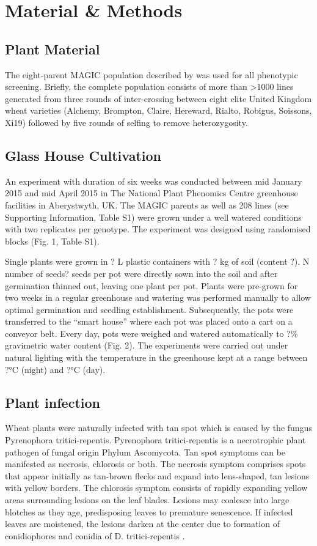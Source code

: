 \documentclass{frontiersSCNS} %
\begin{document}
\section{Material \& Methods}

\subsection{Plant Material}
The eight-parent MAGIC population described by \cite{Mackay01092014} was used for all phenotypic screening. Briefly, the complete population consists of more than >1000 lines generated from three rounds of inter-crossing between eight elite United Kingdom wheat varieties (Alchemy, Brompton, Claire, Hereward, Rialto, Robigus, Soissons, Xi19) followed by five rounds of selfing to remove heterozygosity. 

\subsection{Glass House Cultivation}
An experiment with duration of six weeks was conducted between mid January 2015 and mid April 2015 in The National Plant Phenomics Centre greenhouse facilities in Aberystwyth, UK. The MAGIC parents as well as 208 lines (see Supporting Information, Table S1) were grown under a well watered conditions with two replicates per genotype. The experiment was designed using randomised blocks (Fig. 1, Table S1).

Single plants were grown in ? L plastic containers with ? kg of soil (content ?). N number of seeds? seeds per pot were directly sown into the soil and after germination thinned out, leaving one plant per pot. Plants were pre-grown for two weeks in a regular greenhouse and watering was performed manually to allow optimal germination and seedling establishment. Subsequently, the pots were transferred to the “smart house” where each pot was placed onto a cart on a conveyor belt. Every day, pots were weighed and watered automatically to ?\% gravimetric water content (Fig. 2). The experiments were carried out under natural lighting with the temperature in the greenhouse kept at a range between ?°C (night) and ?°C (day).

\subsection{Plant infection}
Wheat plants were naturally infected with tan spot which is caused by the fungus Pyrenophora tritici-repentis. Pyrenophora tritici-repentis is a necrotrophic plant pathogen of fungal origin Phylum Ascomycota. Tan spot symptoms can be manifested as necrosis, chlorosis or both. The necrosis symptom comprises spots that appear initially as tan-brown flecks and expand into lens-shaped, tan lesions with yellow borders. The chlorosis symptom consists of rapidly expanding yellow areas surrounding lesions on the leaf blades. Lesions may coalesce into large blotches as they age, predisposing leaves to premature senescence.  If infected leaves are moistened, the lesions darken at the center due to formation of conidiophores and conidia of D. tritici-repentis \cite{Singh2009}. 
\end{document}
